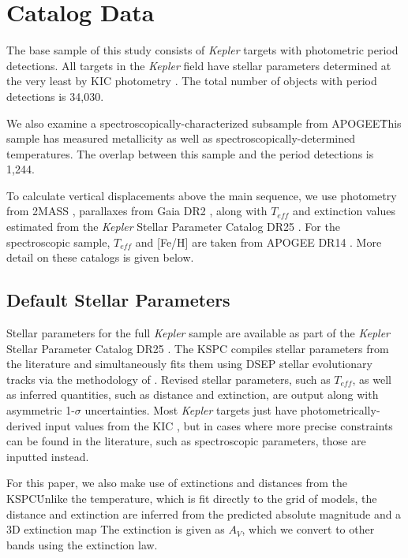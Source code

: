 \documentclass[manuscript]{aastex6}
\newcommand{\Kepler}{\mbox{\textit{Kepler}}}
\newcommand{\Teff}{\ensuremath{T_{eff}}}
\begin{document}
\section{Catalog Data}
\label{sec:data}

The base sample of this study consists of \Kepler{} targets with photometric
period detections. All targets in the \Kepler{} field have stellar parameters
determined at the very least by KIC photometry \citep{Brown11}. The total
number of objects with period detections is 34,030.

We also examine a spectroscopically-characterized subsample from APOGEE\. This
sample has measured metallicity as well as spectroscopically-determined
temperatures. The overlap between this sample and the \citet{McQuillan14}
period detections is 1,244.

To calculate vertical displacements above the main sequence, we use photometry
from 2MASS \citep{Skrutskie06}, parallaxes from Gaia DR2 \citep{Gaia18}, along
with \Teff{} and extinction values estimated from the \Kepler{} Stellar 
Parameter Catalog DR25 \citep[KSPC]{Huber14,Mathur17}. For the spectroscopic sample,
\Teff{} and [Fe/H] are taken from APOGEE DR14 \citep{Abolfathi18}. More detail
on these catalogs is given below.

\subsection{Default Stellar Parameters}

Stellar parameters for the full \Kepler{} sample are available as part of the
\Kepler{} Stellar Parameter Catalog DR25 \citep[KSPC]{Mathur17}. The KSPC
compiles stellar parameters from the literature and simultaneously fits them
using DSEP \citep{Dotter08} stellar evolutionary tracks via the methodology of
\citet{Huber14}. Revised stellar parameters, such as \Teff, as well as inferred
quantities, such as distance and extinction, are output along with asymmetric
1-\(\sigma\) uncertainties. Most \Kepler{} targets just have
photometrically-derived input values from the KIC \citep{Brown11}, but in cases
where more precise constraints can be found in the literature, such as
spectroscopic parameters, those are inputted instead.

For this paper, we also make use of extinctions and distances from the KSPC\.
Unlike the temperature, which is fit directly to the grid of models, the
distance and extinction are inferred from the predicted absolute magnitude and
a 3D extinction map \citep{Amores05} The extinction is given as \(A_V\), which we
convert to other bands using the \citep{Cardelli89} extinction law.
\end{document}
